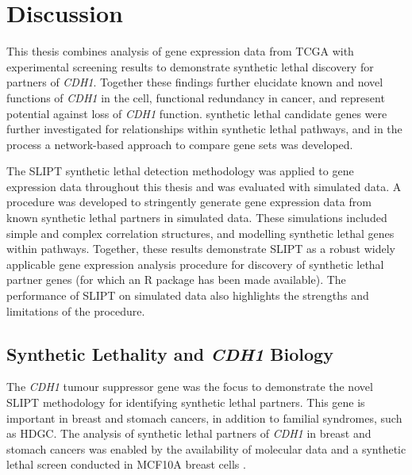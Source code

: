 \chapter{Discussion}
\label{chap:discussion}

This thesis combines analysis of \gls{gene expression} data from \gls{TCGA} with experimental screening results \citep{Telford2015} to demonstrate \gls{synthetic lethal} discovery for partners of \textit{CDH1}. %
Together these findings further elucidate known and novel functions of \textit{CDH1} in the cell, \gls{functional redundancy} in cancer, and represent potential  against loss of \textit{CDH1} function. \Gls{synthetic lethal} candidate genes were further investigated for relationships within \gls{synthetic lethal} pathways, and in the process a network-based approach to compare gene sets was developed.

The \gls{SLIPT} \gls{synthetic lethal} detection methodology was applied to \gls{gene expression} data throughout this thesis and was evaluated with simulated data. A procedure was developed to stringently generate \gls{gene expression} data from known \gls{synthetic lethal} partners in simulated data. These simulations included simple and complex correlation structures, and modelling \gls{synthetic lethal} genes within pathways. Together, these results demonstrate \gls{SLIPT} as a robust widely applicable \gls{gene expression} analysis procedure for discovery of \gls{synthetic lethal} partner genes (for which an R package has been made available). The performance of \gls{SLIPT} on simulated data also highlights the strengths and limitations of the procedure.

\section{Synthetic Lethality and \textit{CDH1} Biology}
\label{chapt6:implications}

The \textit{CDH1} \gls{tumour suppressor} gene was the focus to demonstrate the novel \gls{SLIPT} methodology for identifying \gls{synthetic lethal} partners. This gene is important in  breast and stomach cancers, in addition to \gls{familial} syndromes, such as \gls{HDGC}. The analysis of \gls{synthetic lethal} partners of \textit{CDH1} in breast and stomach cancers was enabled by the availability of molecular data \citep{TCGA2012, TCGA2014GC} and a \gls{synthetic lethal} screen conducted in MCF10A breast cells \citep{Chen2014, Telford2015}.

